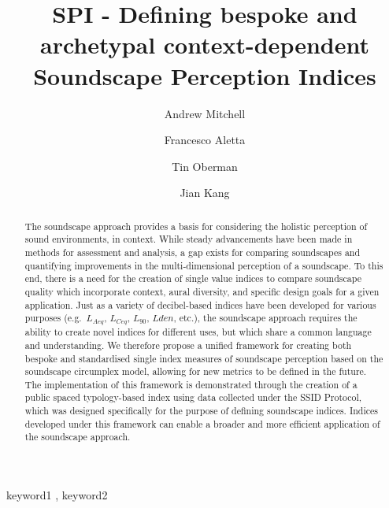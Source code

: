 \documentclass[
  authoryear,
  preprint,
  3p]{elsarticle}
\begin{document}
\begin{frontmatter}
\title{SPI - Defining bespoke and archetypal context-dependent
Soundscape Perception Indices}
\author[1]{Andrew Mitchell%
%
}
\author[1]{Francesco Aletta%
%
}
\author[1]{Tin Oberman%
%
}
\author[]{Jian Kang%
%
}






        
\begin{abstract}
The soundscape approach provides a basis for considering the holistic
perception of sound environments, in context. While steady advancements
have been made in methods for assessment and analysis, a gap exists for
comparing soundscapes and quantifying improvements in the
multi-dimensional perception of a soundscape. To this end, there is a
need for the creation of single value indices to compare soundscape
quality which incorporate context, aural diversity, and specific design
goals for a given application. Just as a variety of decibel-based
indices have been developed for various purposes (e.g.~\(L_{Aeq}\),
\(L_{Ceq}\), \(L_{90}\), \(L{den}\), etc.), the soundscape approach
requires the ability to create novel indices for different uses, but
which share a common language and understanding. We therefore propose a
unified framework for creating both bespoke and standardised single
index measures of soundscape perception based on the soundscape
circumplex model, allowing for new metrics to be defined in the future.
The implementation of this framework is demonstrated through the
creation of a public spaced typology-based index using data collected
under the SSID Protocol, which was designed specifically for the purpose
of defining soundscape indices. Indices developed under this framework
can enable a broader and more efficient application of the soundscape
approach.
\end{abstract}





\begin{keyword}
    keyword1 \sep 
    keyword2
\end{keyword}
\end{frontmatter}
    
\end{document}

